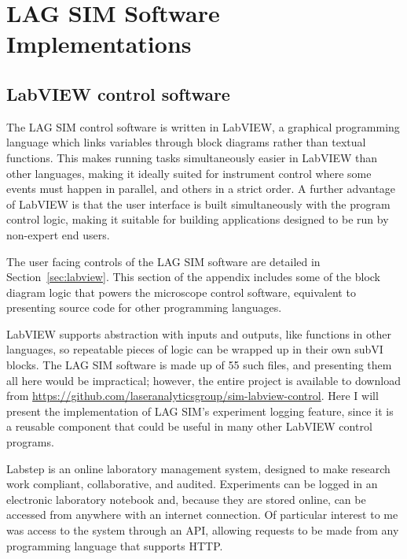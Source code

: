 \chapter{LAG SIM Software Implementations} 

\ifpdf
    \graphicspath{{Appendix1/Figs/Raster/}{Appendix1/Figs/PDF/}{Appendix1/Figs/}}
\else
    \graphicspath{{Appendix1/Figs/Vector/}{Appendix1/Figs/}}
\fi

\section{LabVIEW control software} \label{appx:labview-lagsim}
The LAG SIM control software is written in LabVIEW, a graphical programming language which links variables through block diagrams rather than textual functions. 
This makes running tasks simultaneously easier in LabVIEW than other languages, making it ideally suited for instrument control where some events must happen in parallel, and others in a strict order.
A further advantage of LabVIEW is that the user interface is built simultaneously with the program control logic, making it suitable for building applications designed to be run by non-expert end users. 

The user facing controls of the LAG SIM software are detailed in Section~\ref{sec:labview}. 
This section of the appendix includes some of the block diagram logic that powers the microscope control software, equivalent to presenting source code for other programming languages. 

LabVIEW supports abstraction with inputs and outputs, like functions in other languages, so repeatable pieces of logic can be wrapped up in their own subVI blocks. 
The LAG SIM software is made up of 55 such files, and presenting them all here would be impractical; however, the entire project is available to download from \url{https://github.com/laseranalyticsgroup/sim-labview-control}. 
Here I will present the implementation of LAG SIM's experiment logging feature, since it is a reusable component that could be useful in many other LabVIEW control programs. 

Labstep is an online laboratory management system, designed to make research work compliant, collaborative, and audited. 
Experiments can be logged in an electronic laboratory notebook and, because they are stored online, can be accessed from anywhere with an internet connection.
Of particular interest to me was access to the system through an API, allowing requests to be made from any programming language that supports HTTP. 

